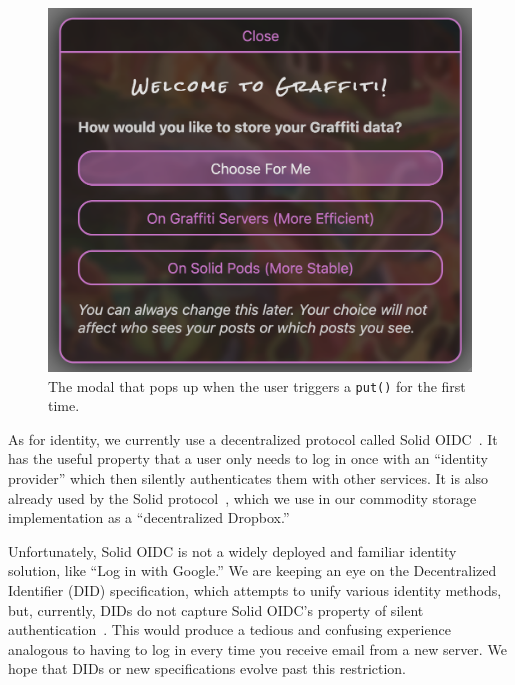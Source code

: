 \begin{figure}[h]
    \includegraphics[width=\columnwidth]{paper/figures/choose-protocol.png}
    \caption{The modal that pops up when the user triggers a \texttt{put()} for the first time.}
    \label{above-and-below:figure:choose-protocol}
\end{figure}

As for identity, we currently use a decentralized protocol called Solid OIDC~\cite{solidoidc}.
It has the useful property that a user only needs to log in once
with an ``identity provider'' which then silently authenticates
them with other services.
It is also already used by the Solid protocol~\cite{solid},
which we use in our commodity storage implementation as a ``decentralized Dropbox.''

Unfortunately, Solid OIDC is not a widely deployed and familiar identity solution,
like ``Log in with Google.''
We are keeping an eye on the Decentralized Identifier (DID) specification, which attempts to unify
various identity methods, but, currently, DIDs
do not capture Solid OIDC's property of silent authentication~\cite{dids}.
This would produce a tedious and confusing experience analogous to having to log in every time you receive email from a new server.
We hope that DIDs or new specifications evolve past this restriction.

